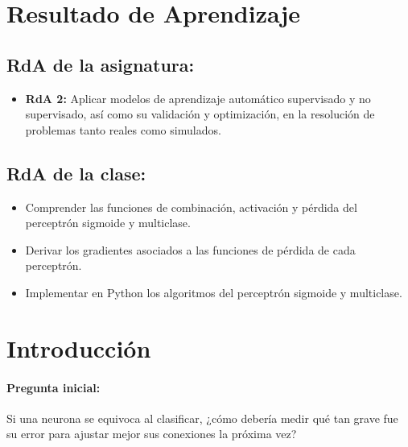 \documentclass[a4,11pt]{aleph-notas}
\begin{document}
\encabezado

\section*{Resultado de Aprendizaje}

\subsection*{RdA de la asignatura:}
\begin{itemize}[leftmargin=*]
    \item \textbf{RdA 2:} Aplicar modelos de aprendizaje automático supervisado y no supervisado, así como su validación y optimización, en la resolución de problemas tanto reales como simulados.
\end{itemize}

\subsection*{RdA de la clase:}
\begin{itemize}[leftmargin=*]
    \item Comprender las funciones de combinación, activación y pérdida del perceptrón sigmoide y multiclase.
    \item Derivar los gradientes asociados a las funciones de pérdida de cada perceptrón.
    \item Implementar en Python los algoritmos del perceptrón sigmoide y multiclase.
\end{itemize}

\section*{Introducción}

\paragraph{Pregunta inicial:} 
Si una neurona se equivoca al clasificar, ¿cómo debería medir qué tan grave fue su error para ajustar mejor sus conexiones la próxima vez?
\end{document}
